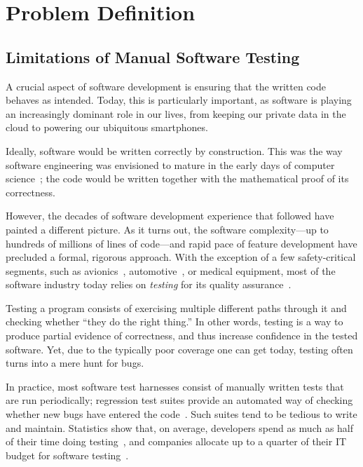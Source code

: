 \section{Problem Definition}

\subsection{Limitations of Manual Software Testing}

A crucial aspect of software development is ensuring that the written code behaves as intended.  Today, this is particularly important, as software is playing an increasingly dominant role in our lives, from keeping our private data in the cloud to powering our ubiquitous smartphones.

Ideally, software would be written correctly by construction.  This was the way software engineering was envisioned to mature in the early days of computer science~\cite{dijkstra1976discipline}; the code would be written together with the mathematical proof of its correctness.

However, the decades of software development experience that followed have painted a different picture.  As it turns out, the software complexity---up to hundreds of millions of lines of code---and rapid pace of feature development have precluded a formal, rigorous approach.
%
With the exception of a few safety-critical segments, such as avionics~\cite{Astree}, automotive~\cite{automotive}, or medical equipment, most of the software industry today relies on \emph{testing} for its quality assurance~\cite{softwareMetrics}.

Testing a program consists of exercising multiple different paths through it and checking whether ``they do the right thing.''  In other words, testing is a way to produce partial evidence of correctness, and thus increase confidence in the tested software.  Yet, due to the typically poor coverage one can get today, testing often turns into a mere hunt for bugs.

In practice, most software test harnesses consist of manually written tests that are run periodically; regression test suites provide an automated way of checking whether new bugs have entered the code~\cite{codeComplete}.
%
Such suites tend to be tedious to write and maintain.  Statistics show that, on average, developers spend as much as half of their time doing testing~\cite{codeComplete}, and companies allocate up to a quarter of their IT budget for software testing~\cite{capgemini-world-quality}.

